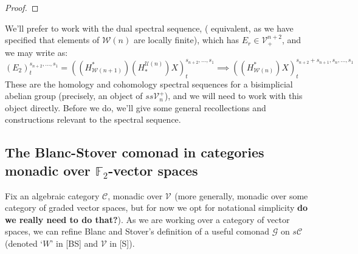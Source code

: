 \documentclass[11pt]{amsart}
\theoremstyle{plain}
\theoremstyle{definition}
\newcommand{\scrG}{\mathscr{G}}
\newcommand{\scrV}{\mathscr{V}}
\newcommand{\calW}{\mathcal{W}}
\newcommand{\calU}{\mathcal{U}}
\newcommand{\calC}{\mathcal{C}}
\newcommand{\calV}{\mathcal{V}}
\theoremstyle{plain}
\newcommand{\vect}[2]{\calV^{#1}_{#2}}
\newcommand{\BSW}{{\scrG}}
\newcommand{\F}{\mathbb{F}}
\begin{document}
\begin{Composite functor spectral sequences}
\begin{proof}
\end{proof}
We'll prefer to work with the dual spectral sequence, ( equivalent, as we have specified that elements of $\calW(n)$ are locally finite), which has $E_r\in\vect{n+2}{+}$, and we may write as:
\[(E_2)^{s_{n+2},\ldots,s_1}_t=((H^*_{\calW(n+1)})(H_*^{\calU(n)})X)^{s_{n+2},\ldots,s_1}_t\implies ((H^*_{\calW(n)})X)^{s_{n+2}+s_{n+1},s_n,\ldots,s_1}_t\]
These are the homology and cohomology spectral sequences for a bisimplicial abelian group (precisely, an object of $ss\vect{+}{n}$), and we will need to work with this object directly. Before we do, we'll give some general recollections and constructions relevant to the spectral sequence.

\subsection{The Blanc-Stover comonad in categories monadic over $\F_2$-vector spaces}
Fix an algebraic category $\calC$, monadic over $\vect{}{}$ (more generally, monadic over some category of graded vector spaces, but for now we opt for notational simplicity \textbf{do we really need to do that?}). As we are working over a category of vector spaces, we can refine Blanc and Stover's definition \cite{Blanc_Stover-Groth_SS.pdf} of a useful comonad $\BSW$ on $s\calC$ (denoted `$W$' in [BS] and $\scrV$ in [S]).


\end{Composite functor spectral sequences}
\end{document}
